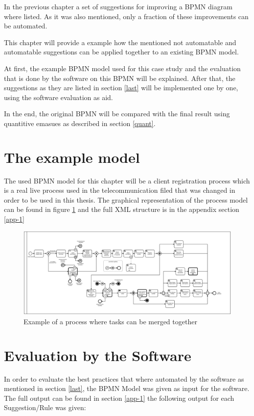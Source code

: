 In the previous chapter a set of suggestions for improving a BPMN diagram where listed. As it was also mentioned, only a fraction of these improvements can be automated. 

This chapter will provide a example how the mentioned not automatable and automatable suggestions can be applied together to an existing BPMN model. 

At first, the example BPMN model used for this case study and the evaluation that is done by the software on this BPMN will be explained. After that, the suggestions as they are listed in section \ref{last} will be implemented one by one, using the software evaluation as aid. 

In the end, the original BPMN will be compared with the final result using quantitive emasues as described in section \ref{quant}.

\section{The example model}
The used BPMN model for this chapter will be a client registration process which is a real live process used in the telecommunication filed that was changed in order to be used in this thesis. The graphical representation of the process model can be found in figure \ref{fig:example-process} and the full XML structure is in the appendix section \ref{app-1}

\begin{figure}[H]
	\centering
	\includegraphics[width=1.7\columnwidth, angle=90 ]{graphics/process-bpmn.pdf}
	\caption{Example of a process where tasks can be merged together} 
	\label{fig:example-process} 
\end{figure}

\section{Evaluation by the Software}
In order to evaluate the best practices that where automated by the software as mentioned in section \ref{last}, the BPMN Model was given as input for the software. The full output can be found in section \ref{app-1} the following output for each Suggestion/Rule was given:
